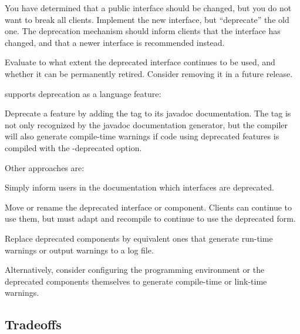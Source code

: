 \documentclass[a4paper,10pt,twoside]{book}
\begin{document}
\begin{bulletlist}
\item You have determined that a public interface should be changed, but you do not want to break all clients. Implement the new interface, but ``deprecate'' the old one. The deprecation mechanism should inform clients that the interface has changed, and that a newer interface is recommended instead.

\item Evaluate to what extent the deprecated interface continues to be used, and whether it can be permanently retired. Consider removing it in a future release.

\item {} supports deprecation as a language feature:
\begin{bulletlist}
\item Deprecate a feature by adding the tag  to its javadoc documentation. The tag is not only recognized by the javadoc documentation generator, but the compiler will also generate compile-time warnings if code using deprecated features is compiled with the -deprecated option.
\end{bulletlist}

\item Other approaches are:

\begin{bulletlist}
\item Simply inform users in the documentation which interfaces are deprecated.

\item Move or rename the deprecated interface or component. Clients can continue to use them, but must adapt and recompile to continue to use the deprecated form.

\item Replace deprecated components by equivalent ones that generate run-time warnings or output warnings to a log file. 

\item Alternatively, consider configuring the programming environment or the deprecated components themselves to generate compile-time or link-time warnings.
\end{bulletlist}
\end{bulletlist}

\subsection*{Tradeoffs}
\end{document}
